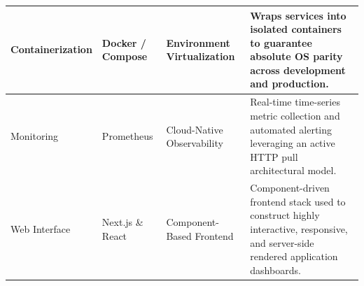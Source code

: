 \begin{table}[H]
{\begin{tabular}{p{}
                    p{}
                    p{}
                    p{}}
    Containerization & Docker \cite{DockerAcceleratedContainer} / Compose \cite{DockerCompose} & Environment Virtualization & Wraps services into isolated containers to guarantee absolute \gls{OS} parity across development and production. \\ \midrule

    Monitoring & Prometheus \cite{PrometheusMonitoringSystem} & Cloud-Native Observability & Real-time time-series metric collection and automated alerting leveraging an active \gls{HTTP} pull architectural model. \\ \midrule

    Web Interface & Next.js \cite{NextjsVercelReact} \& React \cite{React} & Component-Based Frontend & Component-driven frontend stack used to construct highly interactive, responsive, and server-side rendered application dashboards. \\ 
    \bottomrule
    \end{tabular}
    }
\end{table}